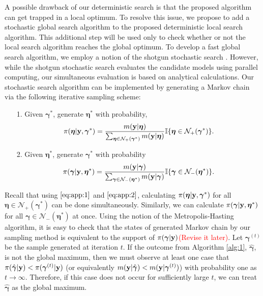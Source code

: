 \documentclass[12pt]{article}
\def\uy{{\bf y}}
\def\bg{{\boldsymbol \gamma}}
\def\ueta{{\boldsymbol \eta}}
\def\ueta{{\boldsymbol \eta}}
\begin{document}
A possible drawback of our deterministic search is that the proposed algorithm can get trapped in a local optimum. To resolve this issue, we propose to add a stochastic global search algorithm to the proposed deterministic local search algorithm. This additional step will be used only to check whether or not the local search algorithm reaches the global optimum. To develop a fast global search algorithm, we employ a notion of the shotgun stochastic search \citep{hans2007shotgun}. However, while the shotgun stochastic search evaluates the candidate models using parallel computing, our simultaneous evaluation is based on analytical calculations. Our stochastic search algorithm can be implemented by generating a Markov chain via the following iterative sampling scheme:
\begin{itemize}
 \item[1.] Given $\bg^*$, generate $\ueta^*$ with probability,
       $$\pi(\ueta|\uy,\bg^*)=\frac{m(\uy|\ueta)}{\sum_{\ueta \in \mathcal{N}_+(\bg^* )  } m(\uy|\ueta) }\mathbb{I}\{\ueta \in \mathcal{N}_+(\bg^* ) \}.$$
 \item[2.] Given $\ueta^*$, generate $\bg^*$ with probability
       $$\pi(\bg|\uy,\ueta^*)=\frac{m(\uy|\bg)}{\sum_{\bg \in \mathcal{N}_-({\ueta}^* )  } m(\uy|\bg) }\mathbb{I}\{\bg \in \mathcal{N}_-({\ueta}^* )   \}.$$
\end{itemize}
Recall that  using $\eqref{eq:app:1}$ and  $\eqref{eq:app:2}$, calculating $\pi(\ueta|\uy,\bg^*)$ for all $\ueta \in \mathcal{N}_+(\bg^* )$ can be done simultaneously. Similarly, we can calculate $\pi(\bg|\uy,\ueta^*)$ for all $\bg \in \mathcal{N}_-({\ueta}^* ) $ at once.
Using the notion of the Metropolis-Hasting algorithm, it is easy to check that the states of generated Markov chain by our sampling method is equivalent to the support of $\pi(\bg|\uy)$\textcolor{red}{(Revise it later)}. Let $\bg^{(t)}$ be the sample generated at iteration $t$. If the outcome from Algorithm \ref{alg:1}, $\hat{\bg}$, is not the global maximum, then we must observe at least one case that $\pi(\hat{\bg}|\uy)< \pi(\bg^{(t)}|\uy)$ (or equivalently $m(\uy|\hat{\bg})<m(\uy|\bg^{(t)})$) with probability one as $t\to \infty$. Therefore, if this case does not occur for sufficiently large $t$, we can treat $\hat{\bg}$ as the global maximum.
\end{document}
